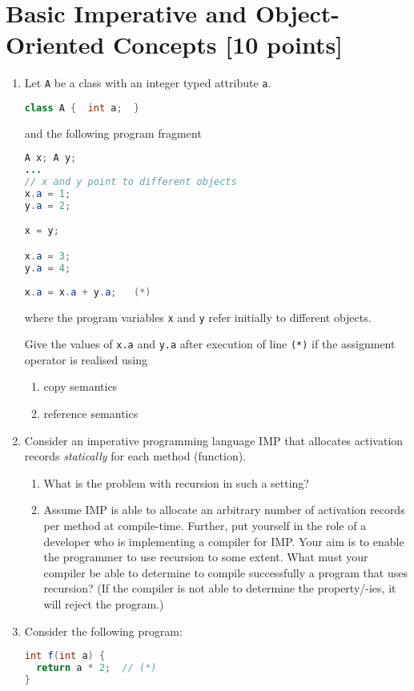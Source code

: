 \documentclass{article}
\begin{document}
\section{Basic Imperative and Object-Oriented Concepts [10 points]}


\begin{enumerate}
\item Let \lstinline!A! be a class with an integer typed attribute
  \lstinline!a!.
\begin{lstlisting}[language=Java, columns=flexible]
class A {  int a;  }
\end{lstlisting}

and the following program fragment
\begin{lstlisting}[language=Java, columns=flexible] 
A x; A y;
...
// x and y point to different objects
x.a = 1;
y.a = 2;

x = y;

x.a = 3;
y.a = 4;
      
x.a = x.a + y.a;   (*)
\end{lstlisting}
where the program variables \lstinline!x! and \lstinline!y! refer
initially to different objects.

Give the values of \lstinline!x.a! and \lstinline!y.a! after execution
of line \lstinline!(*)! if the assignment operator is realised using
\begin{enumerate}
  \item copy semantics 
  \item reference semantics 
\end{enumerate}
\item Consider an imperative programming language \textsf{IMP} that
  allocates activation records \emph{statically} for each method
  (function). 
  \begin{enumerate}
  \item What is the problem with recursion in such a setting?  
  \item Assume \textsf{IMP} is able to allocate an arbitrary number of
    activation records per method at compile-time. Further, put
    yourself in the role of a developer who is implementing a compiler
    for \textsf{IMP}. Your aim is to enable the programmer to use
    recursion to some extent. What must your compiler be able to
    determine to compile successfully a program that uses recursion?
    (If the compiler is not able to determine the property/-ies, it
    will reject the program.)
 \end{enumerate}
\item Consider the following program:
\begin{lstlisting}[language=Java, columns=flexible] 
int f(int a) {
  return a * 2;  // (*)
} 


\end{lstlisting}
\end{enumerate}
\end{document}
